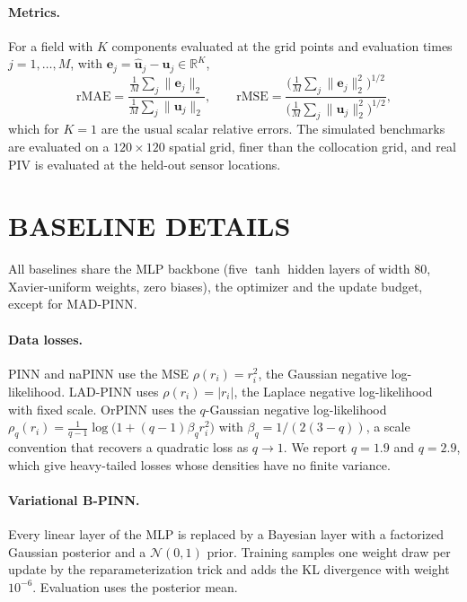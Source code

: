 \documentclass[twoside]{article}
\begin{document}
\paragraph{Metrics.}
For a field with $K$ components evaluated at the grid points and evaluation
times $j = 1,\dots,M$, with $\mathbf{e}_j = \hat{\mathbf{u}}_j - \mathbf{u}_j \in
\mathbb{R}^K$,
\begin{equation*}
\mathrm{rMAE} = \frac{\frac{1}{M}\sum_j \|\mathbf{e}_j\|_2}{\frac{1}{M}\sum_j
\|\mathbf{u}_j\|_2}, \qquad
\mathrm{rMSE} = \frac{\big(\frac{1}{M}\sum_j \|\mathbf{e}_j\|_2^2\big)^{1/2}}
{\big(\frac{1}{M}\sum_j \|\mathbf{u}_j\|_2^2\big)^{1/2}},
\end{equation*}
which for $K = 1$ are the usual scalar relative errors. The
simulated benchmarks are evaluated on a $120 \times 120$ spatial grid, finer
than the collocation grid, and real PIV is evaluated at the held-out sensor
locations.

\section{BASELINE DETAILS}
\label{app:baselines}

All baselines share the MLP backbone (five $\tanh$ hidden layers of width $80$,
Xavier-uniform weights, zero biases), the optimizer and the update budget,
except for MAD-PINN.

\paragraph{Data losses.} PINN and naPINN use the MSE $\rho(r_i) = r_i^2$, the
Gaussian negative log-likelihood. LAD-PINN uses $\rho(r_i) =
|r_i|$, the Laplace negative log-likelihood with fixed scale. OrPINN \citep{Duarte2025} uses the
$q$-Gaussian negative log-likelihood
$\rho_q(r_i) = \frac{1}{q-1}\log\!\big(1 + (q-1)\beta_q r_i^2\big)$ with
$\beta_q = 1/(2(3-q))$, a scale convention that recovers a quadratic loss as
$q \to 1$. We report $q = 1.9$ and $q = 2.9$, which give heavy-tailed losses
whose densities have no finite variance.

\paragraph{Variational B-PINN.} Every linear layer of the MLP is replaced by a
Bayesian layer with a factorized Gaussian posterior and a $\mathcal{N}(0,1)$
prior. Training samples one weight draw per update by the reparameterization
trick and adds the KL divergence with weight $10^{-6}$. Evaluation uses the
posterior mean.
\end{document}
